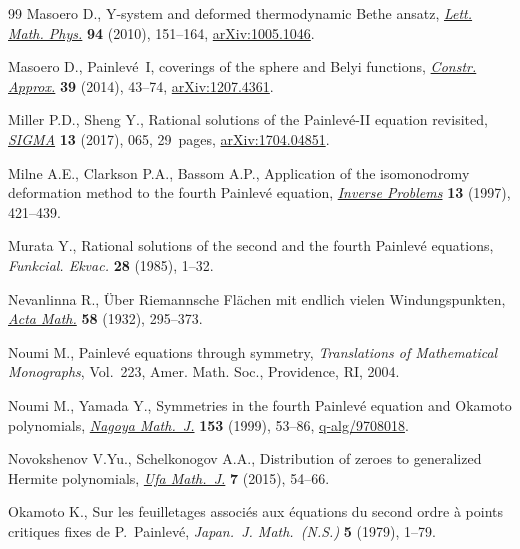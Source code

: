 \documentclass[pdftex]{sigma}
\numberwithin{equation}{section}
\begin{document}
\begin{thebibliography}{99}
Masoero D., Y-system and deformed thermodynamic {B}ethe ansatz, \href{https://doi.org/10.1007/s11005-010-0425-1}{\textit{Lett.
 Math. Phys.}} \textbf{94} (2010), 151--164, \href{https://arxiv.org/abs/1005.1046}{arXiv:1005.1046}.

Masoero D., Painlev\'e~{I}, coverings of the sphere and {B}elyi functions,
 \href{https://doi.org/10.1007/s00365-013-9185-3}{\textit{Constr. Approx.}} \textbf{39} (2014), 43--74, \href{https://arxiv.org/abs/1207.4361}{arXiv:1207.4361}.

Miller P.D., Sheng Y., Rational solutions of the {P}ainlev\'e-{II} equation
 revisited, \href{https://doi.org/10.3842/SIGMA.2017.065}{\textit{SIGMA}} \textbf{13} (2017), 065, 29~pages,
 \href{https://arxiv.org/abs/1704.04851}{arXiv:1704.04851}.

Milne A.E., Clarkson P.A., Bassom A.P., Application of the isomonodromy
 deformation method to the fourth {P}ainlev\'e equation, \href{https://doi.org/10.1088/0266-5611/13/2/015}{\textit{Inverse
 Problems}} \textbf{13} (1997), 421--439.

Murata Y., Rational solutions of the second and the fourth {P}ainlev\'e
 equations, \textit{Funkcial. Ekvac.} \textbf{28} (1985), 1--32.

Nevanlinna R., \"Uber {R}iemannsche {F}l\"achen mit endlich vielen
 {W}indungspunkten, \href{https://doi.org/10.1007/BF02547780}{\textit{Acta Math.}} \textbf{58} (1932), 295--373.

Noumi M., Painlev\'e equations through symmetry, \textit{Translations of
 Mathematical Monographs}, Vol.~223, Amer. Math. Soc., Providence, RI, 2004.

Noumi M., Yamada Y., Symmetries in the fourth {P}ainlev\'e equation and
 {O}kamoto polynomials, \href{http://projecteuclid.org/euclid.nmj/1114630819}{\textit{Nagoya Math.~J.}} \textbf{153} (1999), 53--86,
 \href{https://arxiv.org/abs/q-alg/9708018}{q-alg/9708018}.

Novokshenov V.Yu., Schelkonogov A.A., Distribution of zeroes to generalized
 {H}ermite polynomials, \href{https://doi.org/10.13108/2015-7-3-54}{\textit{Ufa Math.~J.}} \textbf{7} (2015), 54--66.

Okamoto K., Sur les feuilletages associ\'es aux \'equations du second ordre \`a
 points critiques f\/ixes de {P}.~{P}ainlev\'e, \textit{Japan.~J. Math.~(N.S.)}
 \textbf{5} (1979), 1--79.


\end{thebibliography}
\end{document}
